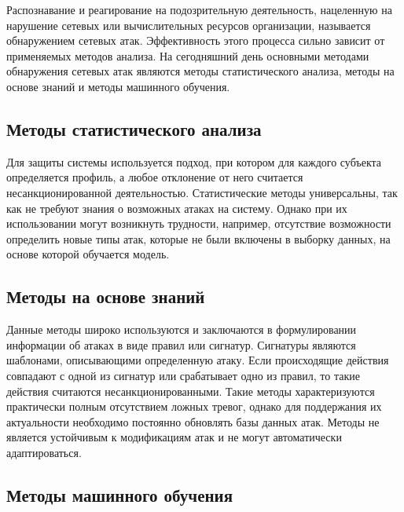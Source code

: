 Распознавание и реагирование на подозрительную деятельность,
нацеленную на нарушение сетевых или вычислительных ресурсов организации,
называется обнаружением сетевых атак.
Эффективность этого процесса сильно зависит от применяемых методов анализа.
На сегодняшний день основными методами обнаружения сетевых атак являются методы статистического анализа,
методы на основе знаний и методы машинного обучения.


\subsection{Методы статистического анализа}
Для защиты системы используется подход, при котором для каждого субъекта определяется профиль,
а любое отклонение от него считается несанкционированной деятельностью. 
Статистические методы универсальны, так как не требуют знания о возможных атаках на систему.
Однако при их использовании могут возникнуть трудности, например, отсутствие возможности определить новые типы атак, которые не были включены в выборку данных, на основе которой обучается модель.



\subsection{Методы на основе знаний}
Данные методы широко используются и заключаются в формулировании информации об атаках в виде правил или сигнатур.
Сигнатуры являются шаблонами, описывающими определенную атаку.
Если происходящие действия совпадают с одной из сигнатур или срабатывает одно из правил,
то такие действия считаются несанкционированными. Такие методы
характеризуются практически полным отсутствием ложных тревог, 
однако для поддержания их актуальности необходимо постоянно обновлять базы данных атак. Методы не 
является устойчивым к модификациям атак и не могут автоматически адаптироваться.

\subsection{Методы машинного обучения}

